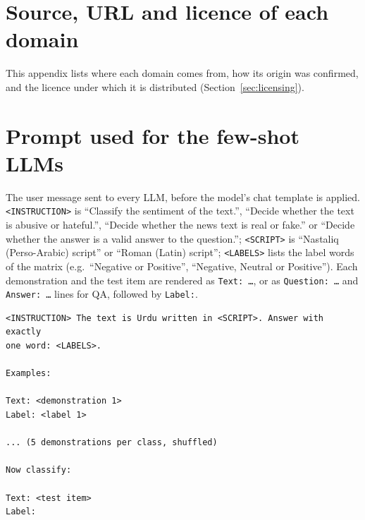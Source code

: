 \documentclass[acmsmall,screen]{acmart}
\begin{document}
\clearpage
\section{Source, URL and licence of each domain}\label{app:prov}
This appendix lists where each domain comes from, how its origin was confirmed, and the licence under which it is distributed (Section~\ref{sec:licensing}).
\begin{table}[H]\centering\scriptsize
\caption{Source and licence of every domain. Verified: our files were matched against the public release (content or file identity). Untraced: obtained from a public upload whose original author could not be identified. Generated: produced by the first author with xAI Grok (Section~\ref{sec:collection}).}
\label{tab:provenance}
\resizebox{\textwidth}{!}{}
\end{table}

\clearpage
\section{Prompt used for the few-shot LLMs}\label{app:prompt}
The user message sent to every LLM, before the model's chat template is applied. \texttt{<INSTRUCTION>} is ``Classify the sentiment of the text.'', ``Decide whether the text is abusive or hateful.'', ``Decide whether the news text is real or fake.'' or ``Decide whether the answer is a valid answer to the question.''; \texttt{<SCRIPT>} is ``Nastaliq (Perso-Arabic) script'' or ``Roman (Latin) script''; \texttt{<LABELS>} lists the label words of the matrix (e.g.\ ``Negative or Positive'', ``Negative, Neutral or Positive''). Each demonstration and the test item are rendered as \texttt{Text: \dots}, or as \texttt{Question: \dots} and \texttt{Answer: \dots} lines for QA, followed by \texttt{Label:}.
\begin{verbatim}
<INSTRUCTION> The text is Urdu written in <SCRIPT>. Answer with exactly
one word: <LABELS>.

Examples:

Text: <demonstration 1>
Label: <label 1>

... (5 demonstrations per class, shuffled)

Now classify:

Text: <test item>
Label:
\end{verbatim}
\end{document}
